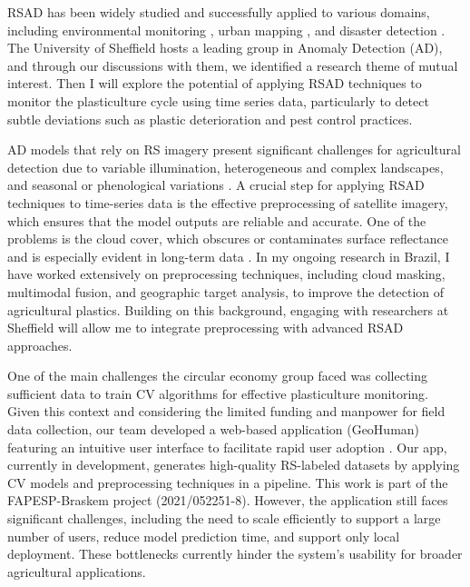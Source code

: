 \documentclass{article} %
\begin{document}
    RSAD has been widely studied \citep{racetin2021systematic,guo2016novel} and successfully applied to various domains, including environmental monitoring \citep{guo2016novel}, urban mapping \citep{rejas2016hyperspectral}, and disaster detection \citep{anand2022anomaly}. The University of Sheffield hosts a leading group in Anomaly Detection (AD), and through our discussions with them, we identified a research theme of mutual interest. Then I will explore the potential of applying RSAD techniques to monitor the plasticulture cycle using time series data, particularly to detect subtle deviations such as plastic deterioration and pest control practices.


    AD models that rely on RS imagery present significant challenges for agricultural detection due to variable illumination, heterogeneous and complex landscapes, and seasonal or phenological variations \citep{fu2025lightweight}. A crucial step for applying RSAD techniques to time-series data is the effective preprocessing of satellite imagery, which ensures that the model outputs are reliable and accurate. One of the problems is the cloud cover, which obscures or contaminates surface reflectance and is especially evident in long-term data \citep{gawlikowski2022explaining,king2013spatial,wen2001impact}. In my ongoing research in Brazil, I have worked extensively on preprocessing techniques, including cloud masking, multimodal fusion, and geographic target analysis, to improve the detection of agricultural plastics. Building on this background, engaging with researchers at Sheffield will allow me to integrate preprocessing with advanced RSAD approaches. 


    One of the main challenges the circular economy group faced was collecting sufficient data to train CV algorithms for effective plasticulture monitoring. Given this context and considering the limited funding and manpower for field data collection, our team developed a web-based application (GeoHuman) featuring an intuitive user interface to facilitate rapid user adoption \citep{bodi1992intuitive}. Our app, currently in development, generates high-quality RS-labeled datasets by applying CV models and preprocessing techniques in a pipeline. This work is part of the FAPESP-Braskem project (2021/052251-8). However, the application still faces significant challenges, including the need to scale efficiently to support a large number of users, reduce model prediction time, and support only local deployment. These bottlenecks currently hinder the system's usability for broader agricultural applications.
\end{document}
